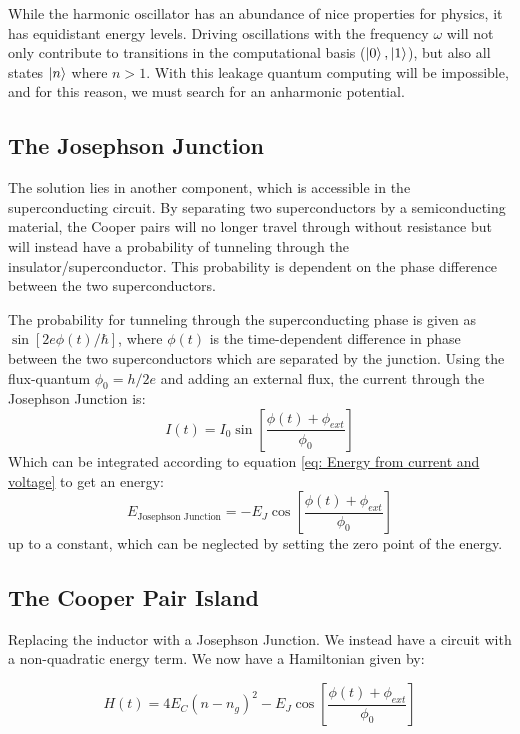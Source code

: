 While the harmonic oscillator has an abundance of nice properties for physics, it has equidistant energy levels. Driving oscillations with the frequency $\omega$ will not only contribute to transitions in the computational basis ($\ket{0}, \ket{1}$), but also all states $\ket{n}$ where $n > 1$. With this leakage quantum computing will be impossible, and for this reason, we must search for an anharmonic potential.

\subsection{The Josephson Junction}
The solution lies in another component, which is accessible in the superconducting circuit. By separating two superconductors by a semiconducting material, the Cooper pairs will no longer travel through without resistance but will instead have a probability of tunneling through the insulator/superconductor. This probability is dependent on the phase difference between the two superconductors. 

The probability for tunneling through the superconducting phase is given as $\sin[2e\phi(t) / \hbar]$, where $\phi(t)$ is the time-dependent difference in phase between the two superconductors which are separated by the junction. Using the flux-quantum $\phi_0 = h / 2e$ and adding an external flux, the current through the Josephson Junction is:
\begin{equation}
    I(t) = I_0 \sin \left[ \frac{\phi(t) + \phi_{ext}}{\phi_0} \right]
\end{equation}
Which can be integrated according to equation \ref{eq: Energy from current and voltage} to get an energy:
\begin{equation}
    E_{\text{Josephson Junction}} = - E_J \cos \left[ \frac{\phi(t) + \phi_{ext}}{\phi_0} \right]
\end{equation}
up to a constant, which can be neglected by setting the zero point of the energy. \cite{vool_introduction_2017}

\subsection{The Cooper Pair Island}
Replacing the inductor with a Josephson Junction. We instead have a circuit with a non-quadratic energy term. We now have a Hamiltonian given by:

\begin{equation}
    H(t) =  4 E_C (n - n_g)^2 -  E_J \cos \left[ \frac{\phi(t) + \phi_{ext}}{\phi_0} \right]
\end{equation}

